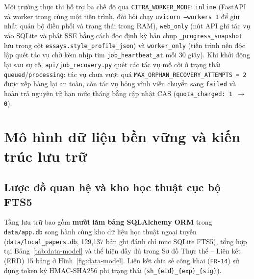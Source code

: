 Môi trường thực thi hỗ trợ ba chế độ qua \texttt{CITRA\_WORKER\_MODE}: \texttt{inline} (FastAPI và worker trong cùng một tiến trình, đòi hỏi chạy \texttt{uvicorn --workers 1} để giữ nhất quán bộ điều phối và trạng thái trong RAM), \texttt{web\_only} (nút API ghi tác vụ vào SQLite và phát SSE bằng cách đọc định kỳ bản chụp \texttt{\_progress\_snapshot} lưu trong cột \texttt{essays.style\_profile\_json}) và \texttt{worker\_only} (tiến trình nền độc lập quét tác vụ chờ kèm nhịp tim \texttt{job\_heartbeat\_at} mỗi 30 giây). Khi khởi động lại sau sự cố, \texttt{api/job\_recovery.py} quét các tác vụ mồ côi ở trạng thái \texttt{queued}/\texttt{processing}: tác vụ chưa vượt quá \texttt{MAX\_ORPHAN\_RECOVERY\_ATTEMPTS = 2} được xếp hàng lại an toàn, còn tác vụ hỏng vĩnh viễn chuyển sang \texttt{failed} và hoàn trả nguyên tử hạn mức tháng bằng cập nhật CAS (\texttt{quota\_charged: 1 $\rightarrow$ 0}).

\section{Mô hình dữ liệu bền vững và kiến trúc lưu trữ}

\subsection{Lược đồ quan hệ và kho học thuật cục bộ FTS5}

Tầng lưu trữ bao gồm \textbf{mười lăm bảng SQLAlchemy ORM} trong \texttt{data/app.db} song hành cùng kho dữ liệu học thuật ngoại tuyến (\texttt{data/local\_papers.db}, 129,137 bản ghi đánh chỉ mục SQLite FTS5), tổng hợp tại Bảng~\ref{tab:data-model} và thể hiện đầy đủ trong Sơ đồ Thực thể -- Liên kết (ERD) 15 bảng ở Hình~\ref{fig:data-model}. Liên kết chia sẻ công khai (\texttt{FR-14}) sử dụng token ký HMAC-SHA256 phi trạng thái (\texttt{sh\_\{eid\}\_\{exp\}\_\{sig\}}).

